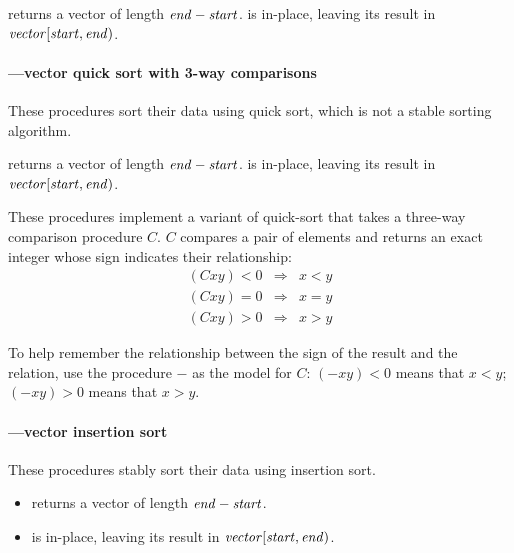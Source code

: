  returns a vector of length \(\textnormal{\textit{end}}-\textnormal{\textit{start}}\). 
 is in-place, leaving its result in
\(\textnormal{\textit{vector}}[\textnormal{\textit{start}},\textnormal{\textit{end}})\).

\paragraph{---vector quick sort with 3-way comparisons}

\begin{protos}
\end{protos}
%
These procedures sort their data using quick sort, 
which is not a stable sorting algorithm.
    
 returns a vector of length \(\textnormal{\textit{end}}-\textnormal{\textit{start}}\). 
 is in-place, leaving its result in
\(\textnormal{\textit{vector}}[\textnormal{\textit{start}},\textnormal{\textit{end}})\).

These procedures implement a variant of quick-sort that takes a three-way
comparison procedure $C$. $C$ compares a pair of elements and returns
an exact integer whose sign indicates their relationship:
%
\begin{eqnarray*}
  (C x y) < 0   &\Rightarrow&   x<y\\
  (C x y) = 0   &\Rightarrow&   x=y\\
  (C x y) > 0   &\Rightarrow&   x>y
\end{eqnarray*}

To help remember the relationship between the sign of the result and
the relation, use the procedure $-$ as the model for $C$: $(- x y) < 0$
means that $x < y$; $(- x y) > 0$ means that $x > y$.

\paragraph{---vector insertion sort}

\begin{protos}
\end{protos}
%
These procedures stably sort their data using insertion sort.
%
\begin{itemize}
\item {} returns a vector of length \(\textnormal{\textit{end}}-\textnormal{\textit{start}}\).
\item {} is in-place, leaving its result in
  \(\textnormal{\textit{vector}}[\textnormal{\textit{start}},\textnormal{\textit{end}})\).
\end{itemize}

